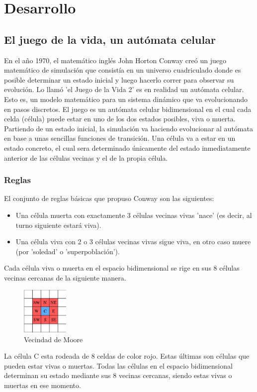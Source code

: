 \documentclass[12pt,a4paper]{book}
\begin{document}
	\chapter{Desarrollo}
	\section{El juego de la vida, un autómata celular}
	En el año 1970, el matemático inglés John Horton Conway creó un juego matemático de simulación que
	consistía en un universo cuadriculado donde es posible determinar un estado inicial y luego hacerlo correr para
	observar su evolución. Lo llamó 'el Juego de la Vida 2' es en realidad un autómata celular. Esto es, un modelo
	matemático para un sistema dinámico que va evolucionando en pasos discretos.
	El juego es un autómata celular bidimensional en el cual cada celda (célula) puede estar en uno de los
	dos estados posibles, viva o muerta. Partiendo de un estado inicial, la simulación va haciendo evolucionar al
	autómata en base a unas sencillas funciones de transición. Una célula va a estar en un estado concreto, el cual
	sera determinado únicamente del estado inmediatamente anterior de las células vecinas y el de la propia
	célula.
	
	\subsection{Reglas}
	El conjunto de reglas básicas que propuso Conway son las siguientes:
	\\
	\begin{itemize}
		\item Una célula muerta con exactamente 3 células vecinas vivas 'nace' (es decir, al turno siguiente estará viva).
		\item Una célula viva con 2 o 3 células vecinas vivas sigue viva, en otro caso muere (por 'soledad' o 'superpoblación').
	\end{itemize}

Cada célula viva o muerta en el espacio bidimensional se rige en sus 8 células vecinas cercanas de la siguiente
manera.
%
\begin{figure}[H]
	\centering
	\includegraphics[width=0.2\textwidth]{imagen1PC}
	\caption{Vecindad de Moore}
\end{figure}
%
La célula C  esta rodeada de 8 celdas de color rojo. Estas últimas son células que pueden estar vivas o muertas. Todas las células en el espacio bidimensional determinan su estado mediante sus 8 vecinas cercanas, siendo estas vivas o muertas en ese momento.
\end{document}
